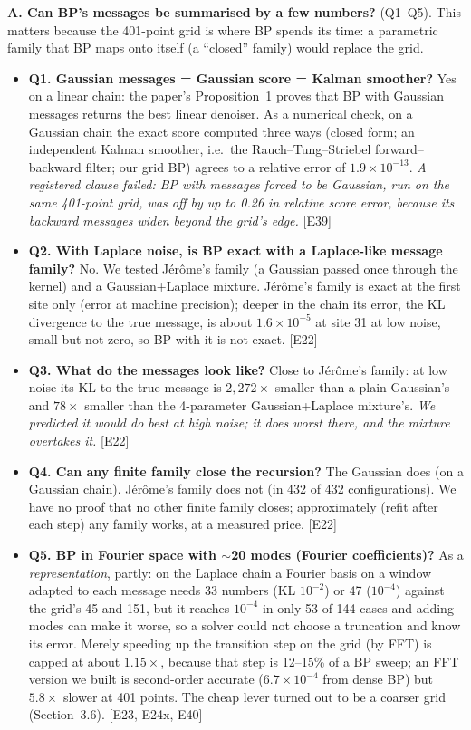 \documentclass[11pt,a4paper]{article}
\newcommand{\src}[1]{{\footnotesize\color{gray}[#1]}}
\newcommand{\fals}[1]{{\small\itshape #1}}
\begin{document}
\textbf{A. Can BP's messages be summarised by a few numbers?} (Q1--Q5). This matters because the 401-point grid is where BP
spends its time: a parametric family that BP maps onto itself (a ``closed'' family) would replace the grid.
\begin{itemize}
\item \textbf{Q1. Gaussian messages = Gaussian score = Kalman smoother?} Yes on a linear chain: the paper's Proposition~1 proves that
BP with Gaussian messages returns the best linear denoiser. As a numerical check, on a Gaussian chain the exact score computed three
ways (closed form; an independent Kalman smoother, i.e.\ the Rauch--Tung--Striebel forward--backward filter; our grid BP) agrees to a
relative error of $1.9\times10^{-13}$. \fals{A registered clause failed: BP with messages forced to be Gaussian, run on the same
401-point grid, was off by up to 0.26 in relative score error, because its backward messages widen beyond the grid's edge.} \src{E39}
\item \textbf{Q2. With Laplace noise, is BP exact with a Laplace-like message family?} No. We tested Jérôme's family (a Gaussian passed
once through the kernel) and a Gaussian+Laplace mixture. Jérôme's family is exact at the first site only (error at machine precision); deeper in the chain
its error, the KL divergence to the true message, is about $1.6\times10^{-5}$ at site 31 at low noise, small but not zero, so BP with
it is not exact. \src{E22}
\item \textbf{Q3. What do the messages look like?} Close to Jérôme's family: at low noise its KL to the true message is $2{,}272\times$
smaller than a plain Gaussian's and $78\times$ smaller than the 4-parameter Gaussian+Laplace mixture's. \fals{We predicted it would do best at high
noise; it does worst there, and the mixture overtakes it.} \src{E22}
\item \textbf{Q4. Can any finite family close the recursion?} The Gaussian does (on a Gaussian chain). Jérôme's family does not (in
432 of 432 configurations). We have no proof that no other finite family closes; approximately (refit after each step) any
family works, at a measured price. \src{E22}
\item \textbf{Q5. BP in Fourier space with $\sim$20 modes (Fourier coefficients)?} As a \emph{representation}, partly: on the Laplace
chain a Fourier basis on a window adapted to each message needs 33 numbers (KL $10^{-2}$) or 47 ($10^{-4}$) against the grid's 45
and 151, but it reaches $10^{-4}$ in only 53 of 144 cases and adding modes can make it worse, so a solver could not choose a
truncation and know its error. Merely speeding up the transition step on the grid (by FFT) is capped at about $1.15\times$, because
that step is 12--15\% of a BP sweep; an FFT version we built is second-order accurate ($6.7\times10^{-4}$ from dense BP) but $5.8\times$ slower at 401 points. The cheap lever
turned out to be a coarser grid (Section~3.6). \src{E23, E24x, E40}
\end{itemize}
\end{document}

